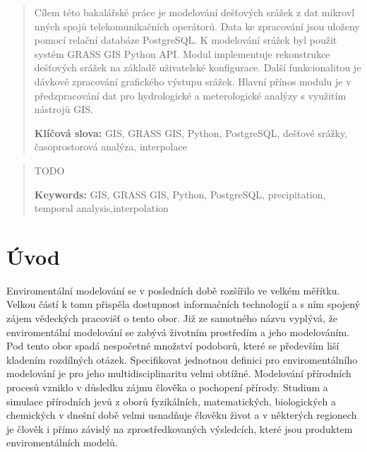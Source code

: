 \documentclass[a4paper,12pt]{article}
\author{Matěj Krejčí}
\newcommand{\klicslova}[2]{\noindent\textbf{#1: }#2}
\newcommand{\necislovana}[1]{%
\phantomsection
\addcontentsline{toc}{section}{#1}
\section*{#1}
\markboth{\uppercase{#1}}{}
}
\begin{document}
\pagestyle{empty}



\newpage


\begin{abstract}
Cílem této bakalářské práce je modelování dešťových srážek z dat mikrovl\-
nných spojů telekomunikačních operátorů. Data ke zpracování jsou uloženy pomocí relační databáze PostgreSQL.
K modelování srážek byl použit systém GRASS GIS Python API. Modul implementuje rekonstrukce dešťových srážek na základě uživatelské konfigurace. Další funkcionalitou je dávkové zpracování grafického výstupu srážek. Hlavní přínos modulu je v předzpracová\-ní dat pro hydrologické a meterologické analýzy s využitím nástrojů GIS.
\bigskip

\klicslova{Klíčová slova}{GIS, GRASS GIS, Python, PostgreSQL, dešťové srážky, časoprostorová analýza, interpolace}

\end{abstract}

\begin{abstract}
TODO 
\bigskip

\klicslova{Keywords}{GIS, GRASS GIS, Python, PostgreSQL, precipitation, temporal analysis,interpolation}

\end{abstract}


\newpage

\newpage
\tableofcontents


\newpage
\pagestyle{fancy}

\necislovana{Úvod}

Enviromentální modelování se v posledních době rozšířilo ve velkém měřítku. Velkou částí k tomu přispěla dostupnost informačních technologií a s ním spojený zájem vědeckých pracovišť o tento obor. Již ze samotného názvu vyplývá, že enviromentální modelování se zabývá životním prostředím a jeho modelováním. Pod tento obor spadá nespočetné množství podoborů, které se především liší kladením rozdílných otázek. Specifikovat jednotnou definici pro enviromentálního modelování je pro jeho multidisciplinaritu velmi obtížné. Modelování přírodních procesů vzniklo v důsledku zájmu člověka o pochopení přírody. Studium a simulace přírodních jevů z oborů fyzikálních, matematických, biologických a chemických v dnešní době velmi usnadňuje člověku život a v některých regionech je člověk i přímo závislý na zprostředkovaných výsledcích, které jsou produktem enviromentálních modelů. 
\end{document}
